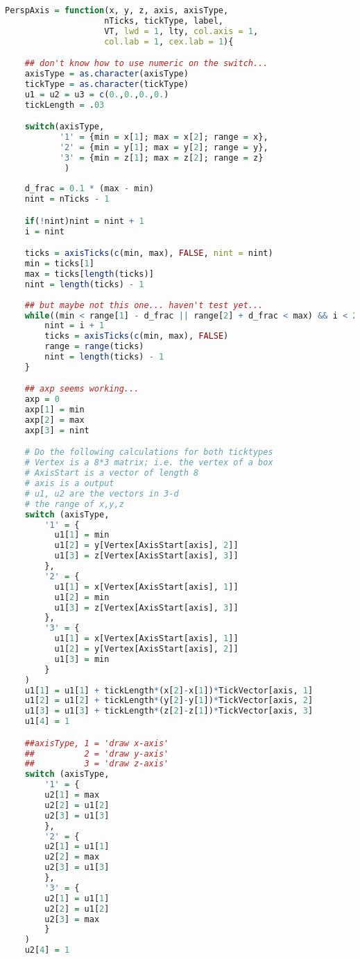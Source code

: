\begin{lstlisting}[language = R]
PerspAxis = function(x, y, z, axis, axisType, 
                    nTicks, tickType, label, 
                    VT, lwd = 1, lty, col.axis = 1,
                    col.lab = 1, cex.lab = 1){

    ## don't know how to use numeric on the switch...
    axisType = as.character(axisType)
    tickType = as.character(tickType)
    u1 = u2 = u3 = c(0.,0.,0.,0.)
    tickLength = .03

    switch(axisType,
           '1' = {min = x[1]; max = x[2]; range = x},
           '2' = {min = y[1]; max = y[2]; range = y},
           '3' = {min = z[1]; max = z[2]; range = z}
            )
            
    d_frac = 0.1 * (max - min)
    nint = nTicks - 1

    if(!nint)nint = nint + 1
    i = nint

    ticks = axisTicks(c(min, max), FALSE, nint = nint)
    min = ticks[1]
    max = ticks[length(ticks)]
    nint = length(ticks) - 1
            
    ## but maybe not this one... haven't test yet...
    while((min < range[1] - d_frac || range[2] + d_frac < max) && i < 20) {
        nint = i + 1
        ticks = axisTicks(c(min, max), FALSE)
        range = range(ticks)
        nint = length(ticks) - 1
    }

    ## axp seems working...
    axp = 0
    axp[1] = min
    axp[2] = max
    axp[3] = nint

    # Do the following calculations for both ticktypes
    # Vertex is a 8*3 matrix; i.e. the vertex of a box
    # AxisStart is a vector of length 8
    # axis is a output 
    # u1, u2 are the vectors in 3-d 
    # the range of x,y,z
    switch (axisType,
        '1' = {
          u1[1] = min
          u1[2] = y[Vertex[AxisStart[axis], 2]]
          u1[3] = z[Vertex[AxisStart[axis], 3]]
        },
        '2' = {
          u1[1] = x[Vertex[AxisStart[axis], 1]]
          u1[2] = min
          u1[3] = z[Vertex[AxisStart[axis], 3]]
        },
        '3' = {
          u1[1] = x[Vertex[AxisStart[axis], 1]]
          u1[2] = y[Vertex[AxisStart[axis], 2]]
          u1[3] = min
        }
    )
    u1[1] = u1[1] + tickLength*(x[2]-x[1])*TickVector[axis, 1]
    u1[2] = u1[2] + tickLength*(y[2]-y[1])*TickVector[axis, 2]
    u1[3] = u1[3] + tickLength*(z[2]-z[1])*TickVector[axis, 3]
    u1[4] = 1

    ##axisType, 1 = 'draw x-axis'
    ##          2 = 'draw y-axis'
    ##          3 = 'draw z-axis'
    switch (axisType,
        '1' = {
        u2[1] = max
        u2[2] = u1[2]
        u2[3] = u1[3]
        },
        '2' = {
        u2[1] = u1[1]
        u2[2] = max
        u2[3] = u1[3]
        },
        '3' = {
        u2[1] = u1[1]
        u2[2] = u1[2]
        u2[3] = max
        }
    )
    u2[4] = 1


\end{lstlisting}
